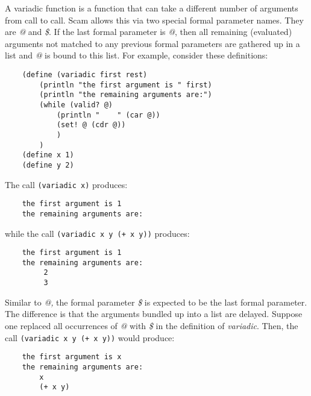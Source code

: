 A variadic function is a function that can take a different
number of arguments from call to call.
Scam allows this via two special formal parameter names.
They are {\it @} and {\it \$}.
If the last formal parameter is {\it @}, then all remaining
(evaluated) arguments not matched to any previous formal
parameters are gathered up in a list and {\it @} is bound to this
list.  For example, consider these definitions:

\begin{verbatim}
    (define (variadic first rest)
        (println "the first argument is " first)
        (println "the remaining arguments are:")
        (while (valid? @)
            (println "    " (car @))
            (set! @ (cdr @))
            )
        )
    (define x 1)
    (define y 2)
\end{verbatim}

The call \verb!(variadic x)! produces:

\begin{verbatim}
    the first argument is 1
    the remaining arguments are:
\end{verbatim}

while the call \verb!(variadic x y (+ x y))! produces:

\begin{verbatim}
    the first argument is 1
    the remaining arguments are:
         2
         3
\end{verbatim}

Similar to {\it @,} the formal parameter {\it \$} is expected to be the
last formal parameter. The difference is that the arguments
bundled up into a list
are delayed. Suppose one replaced all occurrences of {\it @} with
{\it \$} in the definition of {\it variadic}.
Then, the call \verb!(variadic x y (+ x y))! would produce:

\begin{verbatim}
    the first argument is x
    the remaining arguments are:
        x
        (+ x y)
\end{verbatim}
